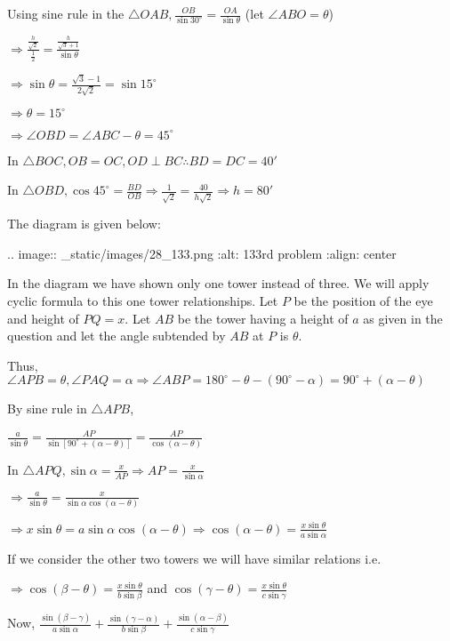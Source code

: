   Using sine rule in the $\triangle OAB, \frac{OB}{\sin30^\circ} = \frac{OA}{\sin\theta}$ (let
  $\angle ABO = \theta$)

  $\Rightarrow \frac{\frac{h}{\sqrt{2}}}{\frac{1}{2}} = \frac{\frac{h}{\sqrt{3} + 1}}{\sin\theta}$

  $\Rightarrow \sin\theta = \frac{\sqrt{3} - 1}{2\sqrt{2}} = \sin15^\circ$

  $\Rightarrow \theta = 15^\circ$

  $\Rightarrow \angle OBD = \angle ABC - \theta = 45^\circ$

  In $\triangle BOC, OB=OC, OD\perp BC \therefore BD = DC = 40'$

  In $\triangle OBD, \cos45^\circ = \frac{BD}{OB} \Rightarrow \frac{1}{\sqrt{2}} =
  \frac{40}{h\sqrt{2}}\Rightarrow h = 80'$

\item The diagram is given below:

  .. image:: _static/images/28_133.png
  :alt: 133rd problem
  :align: center

  In the diagram we have shown only one tower instead of three. We will apply cyclic formula to this one
  tower relationships. Let $P$ be the position of the eye and height of $PQ = x$. Let
  $AB$ be the tower having a height of $a$ as given in the question and let the angle
  subtended by $AB$ at $P$ is $\theta$.

  Thus, $\angle APB = \theta, \angle PAQ = \alpha \Rightarrow \angle ABP = 180^\circ - \theta -
  (90^\circ - \alpha) = 90^\circ + (\alpha - \theta)$

  By sine rule in $\triangle APB$,

  $\frac{a}{\sin\theta} = \frac{AP}{\sin[90^\circ + (\alpha - \theta)]} = \frac{AP}{\cos(\alpha -
    \theta)}$

  In $\triangle APQ, \sin\alpha = \frac{x}{AP} \Rightarrow AP = \frac{x}{\sin\alpha}$

  $\Rightarrow \frac{a}{\sin\theta} = \frac{x}{\sin\alpha\cos(\alpha - \theta)}$

  $\Rightarrow x\sin\theta = a\sin\alpha\cos(\alpha - \theta)\Rightarrow \cos(\alpha - \theta) =
  \frac{x\sin\theta}{a\sin\alpha}$

  If we consider the other two towers we will have similar relations i.e.

  $\Rightarrow \cos(\beta - \theta) = \frac{x\sin\theta}{b\sin\beta}$ and $\cos(\gamma -
  \theta) = \frac{x\sin\theta}{c\sin\gamma}$

  Now, $\frac{\sin(\beta - \gamma)}{a\sin\alpha} + \frac{\sin(\gamma - \alpha)}{b\sin\beta} +
  \frac{\sin(\alpha - \beta)}{c\sin\gamma}$

